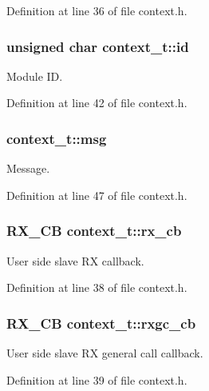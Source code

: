 Definition at line 36 of file context.\-h.

\hypertarget{structcontext__t_afcfccef1ae4111aee136acf0d92b4379}{
\subsubsection[{id}]{\setlength{\rightskip}{0pt plus 5cm}unsigned char context\-\_\-t\-::id}}\label{structcontext__t_afcfccef1ae4111aee136acf0d92b4379}
Module I\-D. 

Definition at line 42 of file context.\-h.

\hypertarget{structcontext__t_ae806cd53ff68971d122ab6f854d22b8d}{
\subsubsection[{msg}]{ context\-\_\-t\-::msg}}\label{structcontext__t_ae806cd53ff68971d122ab6f854d22b8d}
Message. 

Definition at line 47 of file context.\-h.

\hypertarget{structcontext__t_a9d4451da3b62a2ec269ae7fd2f6b24b8}{
\subsubsection[{rx\-\_\-cb}]{\setlength{\rightskip}{0pt plus 5cm}R\-X\-\_\-\-C\-B context\-\_\-t\-::rx\-\_\-cb}}\label{structcontext__t_a9d4451da3b62a2ec269ae7fd2f6b24b8}
User side slave R\-X callback. 

Definition at line 38 of file context.\-h.

\hypertarget{structcontext__t_a108cbe016d12bac90d1582ed0cca91e8}{
\subsubsection[{rxgc\-\_\-cb}]{\setlength{\rightskip}{0pt plus 5cm}R\-X\-\_\-\-C\-B context\-\_\-t\-::rxgc\-\_\-cb}}\label{structcontext__t_a108cbe016d12bac90d1582ed0cca91e8}
User side slave R\-X general call callback. 

Definition at line 39 of file context.\-h.

